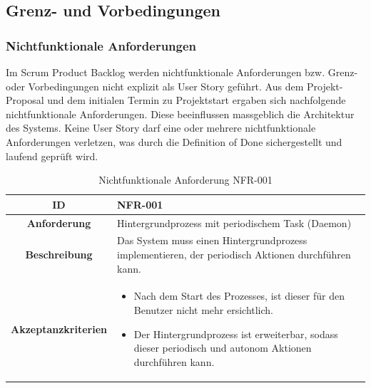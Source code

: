 \documentclass[a4paper,12pt]{report}
\begin{document}
    \newpage

    \subsection{Grenz- und Vorbedingungen}

    \subsubsection{Nichtfunktionale Anforderungen}\label{subsubsec:nichtfunktionale-anforderungen}
    Im Scrum Product Backlog werden nichtfunktionale Anforderungen bzw.
    Grenz- oder Vorbedingungen nicht explizit als User Story geführt.
    Aus dem Projekt-Proposal und dem initialen Termin zu Projektstart ergaben sich nachfolgende nichtfunktionale Anforderungen.
    Diese beeinflussen massgeblich die Architektur des Systems.
    Keine User Story darf eine oder mehrere nichtfunktionale Anforderungen verletzen, was durch die Definition of Done sichergestellt und laufend geprüft wird.

    \begin{table}[h!]
        \centering
        \setlength{\leftmargini}{0.4cm}
        \begin{tabular}{|c|p{10cm}|}
            \hline
            \textbf{ID}           & NFR-001                                                                                            \\ \hline
            \textbf{Anforderung}  & Hintergrundprozess mit periodischem Task (Daemon)                                                  \\ \hline
            \textbf{Beschreibung} & Das System muss einen Hintergrundprozess implementieren, der periodisch Aktionen durchführen kann. \\ \hline
            \textbf{Akzeptanzkriterien} &
            \begin{itemize}
                \item Nach dem Start des Prozesses, ist dieser für den Benutzer nicht mehr ersichtlich.
                \item Der Hintergrundprozess ist erweiterbar, sodass dieser periodisch und autonom Aktionen durchführen kann.
            \end{itemize}
            \\ \hline
        \end{tabular}
        \caption{Nichtfunktionale Anforderung NFR-001}\label{tab:nfr-1}
    \end{table}
\end{document}
